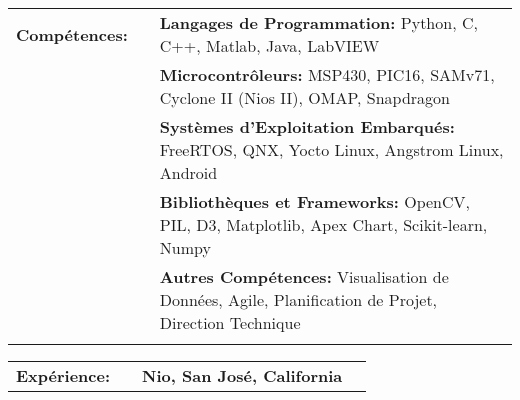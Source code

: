 \documentclass{minimal}
\begin{document}

\begin{center}
\fontsize{14}{12.8}\selectfont
\name\\
\fontsize{10}{12}\selectfont
\address\\
\phone\\
\email\\
\github\\
\end{center}
\vspace{0.5cm}

\begin{tabular}{ p{1.5cm} p{1cm} p{16cm} }
\textbf{Compétences:} & & \textbf{Langages de Programmation:} Python, C, C++, Matlab, Java, LabVIEW\\
& & \textbf{Microcontrôleurs:} MSP430, PIC16, SAMv71, Cyclone II (Nios II), OMAP, Snapdragon\\
& & \textbf{Systèmes d'Exploitation Embarqués:} FreeRTOS, QNX, Yocto Linux, Angstrom Linux, Android\\
& & \textbf{Bibliothèques et Frameworks:} OpenCV, PIL, D3, Matplotlib, Apex Chart, Scikit-learn, Numpy\\
& & \textbf{Autres Compétences:} Visualisation de Données, Agile, Planification de Projet, Direction Technique\\
& & \\
\end{tabular}

\begin{tabular}{ p{1.5cm} p{1cm} p{16cm} >{\raggedleft\arraybackslash}p{3cm} }
\textbf{Expérience:} & & \textbf{Nio, San José, California} & \\
\end{tabular}
\end{document}
